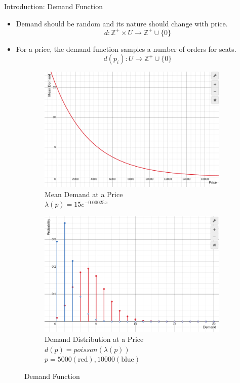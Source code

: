 \begin{frame}{Introduction: Demand Function}
\begin{itemize}
    \item Demand should be random and its nature should change with price.
    $$d: \mathbb{Z}^+ \times U \rightarrow \mathbb{Z}^+ \cup \{0\}$$
    \item For a price, the demand function samples a number of orders for seats.
    $$d(p_i): U \rightarrow \mathbb{Z}^+ \cup \{0\}$$
\end{itemize}
\begin{figure}
    \centering
    \hfill
    \begin{subfigure}[t]{0.45\textwidth}
        \centering
        \includegraphics[width=\textwidth]{figures/mean_demand.png}
        \caption{Mean Demand at a Price \\ $\lambda(p) = 15e^{-0.00025x}$}
    \end{subfigure}
    \hfill
    \begin{subfigure}[t]{0.45\textwidth}
        \centering
        \includegraphics[width=\textwidth]{figures/demand_distribution.png}
        \caption{Demand Distribution at a Price \\ $d(p)=poisson(\lambda(p))$ \\ $p=5000 (\text{red}), 10000 (\text{blue})$}
    \end{subfigure}
    \hfill
    \caption{Demand Function}
\end{figure}
\end{frame}


